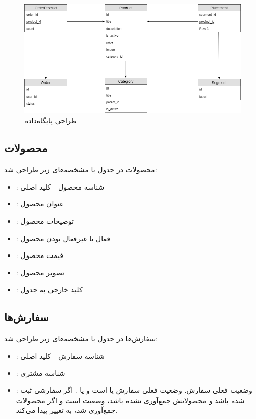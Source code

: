 \begin{figure}[t!]
    \centering
    \includegraphics[scale=0.5]{figures/uml.png}
    \caption{طراحی پایگاه‌داده }
    \label{uml}
\end{figure}

\subsection{محصولات}
محصولات در جدول  با مشخصه‌های زیر طراحی شد:

\begin{itemize}
   	\item \textbf{}: شناسه محصول - کلید اصلی
   	\item \textbf{}: عنوان محصول 
	\item \textbf{}: توضیحات محصول
	\item \textbf{}: فعال یا غیرفعال بودن محصول
	\item \textbf{}: قیمت محصول
	\item \textbf{}: تصویر محصول
	\item \textbf{}: کلید خارجی به جدول 
\end{itemize}

\subsection{سفارش‌ها}
سفارش‌ها در جدول  با مشخصه‌های زیر طراحی شد:
\begin{itemize}
   	\item \textbf{}: شناسه سفارش - کلید اصلی
   	\item \textbf{}: شناسه مشتری 
	\item \textbf{}: وضعیت فعلی سفارش. وضعیت فعلی سفارش یا  است و یا . اگر سفارشی ثبت شده باشد و محصولاتش جمع‌آوری نشده باشد، وضعیت  است و اگر محصولات جمع‌آوری شد، به  تغییر پیدا می‌کند.
\end{itemize}

